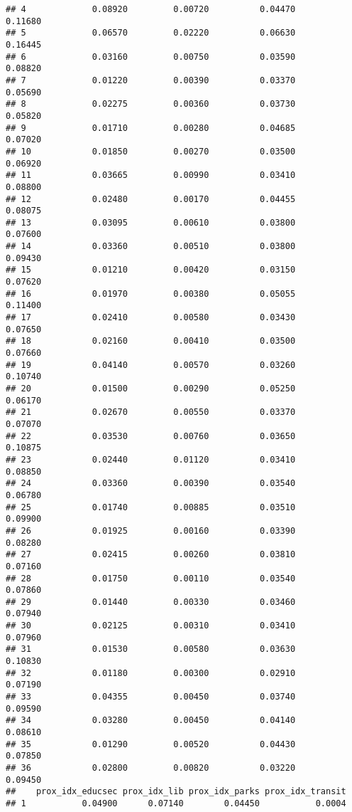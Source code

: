 \documentclass[]{article}
\begin{document}
\begin{verbatim}
## 4             0.08920         0.00720          0.04470          0.11680
## 5             0.06570         0.02220          0.06630          0.16445
## 6             0.03160         0.00750          0.03590          0.08820
## 7             0.01220         0.00390          0.03370          0.05690
## 8             0.02275         0.00360          0.03730          0.05820
## 9             0.01710         0.00280          0.04685          0.07020
## 10            0.01850         0.00270          0.03500          0.06920
## 11            0.03665         0.00990          0.03410          0.08800
## 12            0.02480         0.00170          0.04455          0.08075
## 13            0.03095         0.00610          0.03800          0.07600
## 14            0.03360         0.00510          0.03800          0.09430
## 15            0.01210         0.00420          0.03150          0.07620
## 16            0.01970         0.00380          0.05055          0.11400
## 17            0.02410         0.00580          0.03430          0.07650
## 18            0.02160         0.00410          0.03500          0.07660
## 19            0.04140         0.00570          0.03260          0.10740
## 20            0.01500         0.00290          0.05250          0.06170
## 21            0.02670         0.00550          0.03370          0.07070
## 22            0.03530         0.00760          0.03650          0.10875
## 23            0.02440         0.01120          0.03410          0.08850
## 24            0.03360         0.00390          0.03540          0.06780
## 25            0.01740         0.00885          0.03510          0.09900
## 26            0.01925         0.00160          0.03390          0.08280
## 27            0.02415         0.00260          0.03810          0.07160
## 28            0.01750         0.00110          0.03540          0.07860
## 29            0.01440         0.00330          0.03460          0.07940
## 30            0.02125         0.00310          0.03410          0.07960
## 31            0.01530         0.00580          0.03630          0.10830
## 32            0.01180         0.00300          0.02910          0.07190
## 33            0.04355         0.00450          0.03740          0.09590
## 34            0.03280         0.00450          0.04140          0.08610
## 35            0.01290         0.00520          0.04430          0.07850
## 36            0.02800         0.00820          0.03220          0.09450
##    prox_idx_educsec prox_idx_lib prox_idx_parks prox_idx_transit
## 1           0.04900      0.07140        0.04450           0.0004

\end{verbatim}
\end{document}
